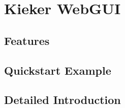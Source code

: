 \chapter{Kieker WebGUI}\label{chp:Kieker-WebGUI}
	\section{Features}
	\section{Quickstart Example}
	\section{Detailed Introduction}